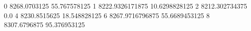 0 8268.0703125 55.767578125
1 8222.9326171875 10.6298828125
2 8212.302734375 0.0
4 8230.8515625 18.548828125
6 8267.9716796875 55.6689453125
8 8307.6796875 95.376953125
